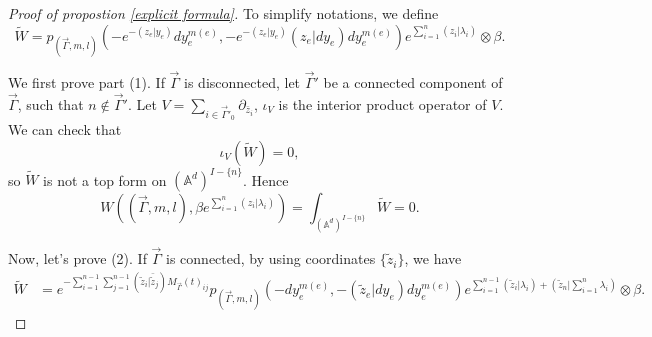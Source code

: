 \documentclass[11pt]{amsart}
\theoremstyle{definition}
\theoremstyle{remark}
\numberwithin{equation}{section}
\begin{document}
    \begin{proof}[Proof of propostion \ref{explicit formula}]
    To simplify notations, we define
    \[
    \tilde{W}=p_{(\vec{\Gamma},m,l)}(-e^{-(z_{e}| y_{e})}dy_{e}^{m(e)},-e^{-(z_{e}| y_{e})}(z_{e}| dy_{e})dy_{e}^{m(e)})e^{\sum\limits_{i=1}^{n}(z_{i}|\lambda_{i})}\otimes \beta.
  \]

    We first prove part (1). If $\vec{\Gamma}$ is disconnected, let $\vec{\Gamma}'$ be a connected component of $\vec{\Gamma}$, such that $n\notin \vec{\Gamma}'$. Let $ V=\sum\limits_{i\in\vec{\Gamma}'_{0}}\partial_{\bar{z}_{i}}$, $\iota_{ V}$ is the interior product operator of $ V$. We can check that
    $$
    \iota_{ V}(\tilde{W})=0,
    $$
    so $\tilde{W}$ is not a top form on $(\mathbb{A}^d)^{ I-\{n\}}$. Hence $$
    W((\vec{\Gamma},m,l),\beta e^{\sum\limits_{i=1}^{n}(z_{i}|\lambda_{i})})=\int_{(\mathbb{A}^{d})^{ I-\{n\}}}\tilde{W}=0.
    $$

    Now, let's prove (2). If $\vec{\Gamma}$ is connected, by using coordinates $\{\tilde{z}_{i}\}$, we have
    \begin{align*}
        \tilde{W}&=e^{-\sum\limits_{i=1}^{n-1}\sum\limits_{j=1}^{n-1}(\tilde{z}_{i}| \bar{\tilde{z}}_{j})M_{\vec{\Gamma}}(t)_{ij}}p_{(\vec{\Gamma},m,l)}(-dy_{e}^{m(e)},-(\tilde{z}_{e}| dy_{e})dy_{e}^{m(e)})e^{\sum\limits_{i=1}^{n-1}(\tilde{z}_{i}|\lambda_{i})+(\tilde{z}_{n}|\sum\limits_{i=1}^{n}\lambda_{i})}\otimes \beta.
    \end{align*}


\end{proof}
\end{document}
